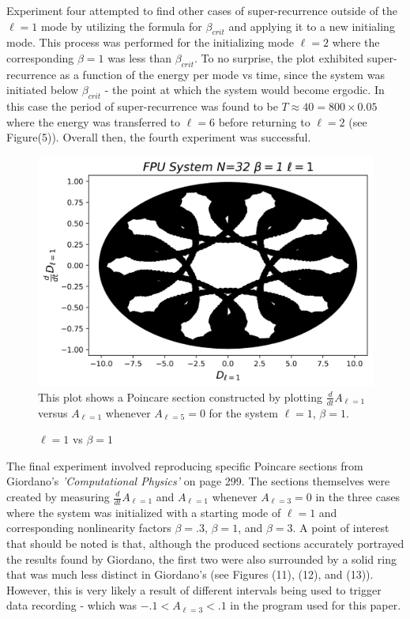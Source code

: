 \documentclass[twocolumn]{article}
\begin{document}
Experiment four attempted to find other cases of super-recurrence outside of the $\ell=1$ mode by utilizing the formula for $\beta_{crit}$ and applying it to a new initialing mode. This process was performed for the initializing mode $\ell=2$ where the corresponding $\beta=1$ was less than $\beta_{crit}$. To no surprise, the plot exhibited super-recurrence as a function of the energy per mode vs time, since the system was initiated below $\beta_{crit}$ - the point at which the system would become ergodic. In this case the period of super-recurrence was found to be $T\approx 40=800\times0.05$ where the energy was transferred to $\ell=6$ before returning to $\ell=2$ (see Figure(5)). Overall then, the fourth experiment was successful.
\begin{figure}[ht!]
\centering
\caption{$\ell=1$ vs $\beta=1$}
\includegraphics[scale=.5]{Poincare5bN=1B=1}
\small{This plot shows a Poincare section constructed by plotting $\frac{d}{dt}A_{\ell=1 }$ versus $A_{\ell=1}$} whenever $A_{\ell=5}=0$ for the system $\ell=1$, $\beta=1$. 
\end{figure}

The final experiment involved reproducing specific Poincare sections from Giordano's \textit{'Computational Physics'} on page 299. The sections themselves were created by measuring $\frac{d}{dt}A_{\ell=1 }$ and $A_{\ell=1}$ whenever $A_{\ell=3}=0$ in the three cases where the system was initialized with a starting mode of $\ell=1$ and corresponding nonlinearity factors $\beta=.3$, $\beta=1$, and $\beta=3$. A point of interest that should be noted is that, although the produced sections accurately portrayed the results found by Giordano, the first two were also surrounded by a solid ring that was much less distinct in Giordano's (see Figures (11), (12), and (13)). However, this is very likely a result of different intervals being used to trigger data recording - which was $-.1<A_{\ell=3}<.1$ in the program used for this paper.
\end{document}
